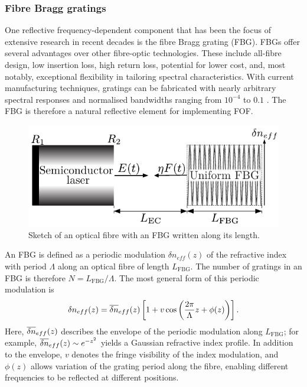\subsubsection*{Fibre Bragg gratings}
\label{subsubsec:FBG}
%
One reflective frequency-dependent component that has been the focus of extensive research in recent decades is the fibre Bragg grating (FBG).
FBGs offer several advantages over other fibre-optic technologies.
These include all-fibre design, low insertion loss, high return loss, potential for lower cost, and, most notably, exceptional flexibility in tailoring spectral characteristics.
With current manufacturing techniques, gratings can be fabricated with nearly arbitrary spectral responses and normalised bandwidths ranging from $10^{-4}$ to $0.1$ \cite{erdogan1997fibre}.
The FBG is therefore a natural reflective element for implementing FOF.
%
\begin{figure}
    \centering 
    \includegraphics[width=\linewidth]{Images/FBG_setup_dneff_only_1col.pdf}
    \caption{Sketch of an optical fibre with an FBG written along its length.}
    \label{fig:FBG_setup}
\end{figure}
%
\par
%
An FBG is defined as a periodic modulation $\delta n_{eff}(z)$ of the refractive index with period $\Lambda$ along an optical fibre of length $L_\text{FBG}$.
The number of gratings in an FBG is therefore $N = L_\text{FBG}/\Lambda$.
The most general form of this periodic modulation is
%
\begin{equation}
\label{eq:dneff}
    \delta n_{eff}(z) = \overline{\delta n}_{eff}(z) \left[ 1 + v \cos{\left( \frac{2 \pi}{\Lambda} z + \phi(z) \right)} \right].
\end{equation}
%
Here, $\overline{\delta n}_{eff}(z)$ describes the envelope of the periodic modulation along $L_\text{FBG}$; for example, $\overline{\delta n}_{eff}(z) \sim e^{-z^2}$ yields a Gaussian refractive index profile.
In addition to the envelope, $v$ denotes the fringe visibility of the index modulation, and $\phi(z)$ allows variation of the grating period along the fibre, enabling different frequencies to be reflected at different positions.
